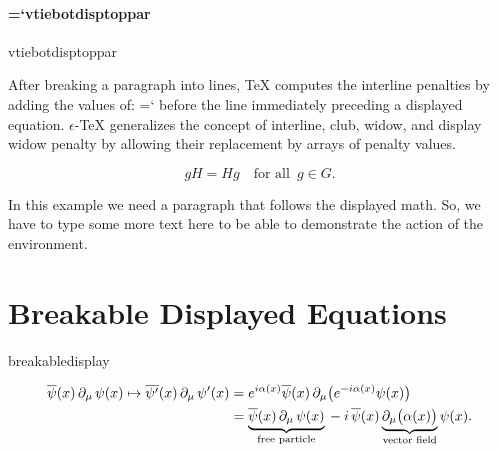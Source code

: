 \documentclass[a4paper]{article}
\newcommand*{\code}[1]{{\ttfamily\hyphenchar\font=`\-\relax #1}}
\newcommand*{\eTeX}{\mbox{\(\epsilon\)-\TeX}}
\begin{document}
\paragraph{\code{vtiebotdisptoppar}}\leavevmode\par

\begin{typoginspect}{vtiebotdisptoppar}
  \begin{vtiebotdisptoppar}[2]
    After breaking a paragraph into lines, \TeX{} computes the interline
    penalties by adding the values of: \code{\string\displaywidowpenalty}
    before the line immediately preceding a displayed equation.
    \eTeX{} generalizes the concept of interline, club, widow, and display widow penalty
    by allowing their replacement by arrays of penalty values.
    \begin{breakabledisplay}
      \begin{displaymath}
        g H = H g \quad \text{for all} \enspace g \in G.
      \end{displaymath}
    \end{breakabledisplay}

    In this example we need a paragraph that follows the displayed math.
    So, we have to type some more text here
    to be able to demonstrate the action of the environment.
  \end{vtiebotdisptoppar}
\end{typoginspect}

\clearpage
\section{Breakable Displayed Equations}

\newcommand*{\binaryminus}{\mathbin{-}}
\newcommand*{\diracadj}[1]{\overline{#1}}
\newcommand*{\unaryminus}{{-}}

\begin{typoginspect}{breakabledisplay}
  \begin{breakabledisplay}
    \begin{align*}
      \diracadj{\psi}(x) \mathop{\partial_\mu} \psi(x)
      \mapsto \diracadj{\psi'}(x) \mathop{\partial_\mu} \psi'(x)
      &=  e^{i \alpha(x)} \diracadj{\psi}(x) \mathop{\partial_\mu} \bigl( e^{\unaryminus i \alpha(x)} \psi(x) \bigr)  \\
      &=  \underbrace{\diracadj{\psi}(x) \mathop{\partial_\mu} \psi(x)}_{\text{free particle}}
      \mskip\medmuskip \binaryminus \mskip\medmuskip i \, \diracadj{\psi}(x)
      \underbrace{\mathop{\partial_\mu} \bigl( \alpha(x) \bigr)}_{\mathclap{\text{vector field}}} \psi(x).
    \end{align*}
  \end{breakabledisplay}
\end{typoginspect}
\end{document}
